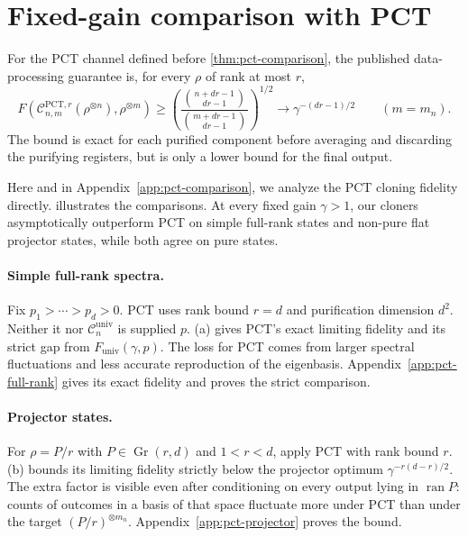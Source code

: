 \documentclass[11pt]{article}
\theoremstyle{remark}
\theoremstyle{plain}
\newcommand{\cC}{\mathcal C}
\newcommand{\Gr}{\operatorname{Gr}}
\newcommand{\ot}{\otimes}
\newcommand{\Funiv}{F_{\mathrm{univ}}}
\begin{document}
\section{Fixed-gain comparison with PCT}\label{sec:pct-comparison}

For the PCT channel defined before \cref{thm:pct-comparison}, the published
data-processing guarantee
\cite{LiTheilHarrowChuang2026,FanizzaGrinkoScharnhorstSpilecki2026,
JeonSohnOh2026} is, for every \(\rho\) of rank at most \(r\),
\begin{equation}\label{eq:pct-data-processing-lower-bound}
  F\!\left(\cC_{n,m}^{\mathrm{PCT},r}(\rho^{\ot n}),
             \rho^{\ot m}\right)
  \ge
  \left(\frac{\binom{n+dr-1}{dr-1}}
              {\binom{m+dr-1}{dr-1}}\right)^{1/2}
  \longrightarrow\gamma^{-(dr-1)/2}
  \qquad(m=m_n).
\end{equation}
The bound is exact for each purified component before averaging and
discarding the purifying registers, but is only a lower bound for the
final output.

Here and in Appendix~\ref{app:pct-comparison}, we analyze
the PCT cloning fidelity directly.  illustrates
the comparisons.  At every fixed gain \(\gamma>1\), our cloners
asymptotically outperform PCT on simple full-rank states and non-pure
flat projector states, while both agree on pure states.

\paragraph{Simple full-rank spectra.}
Fix \(p_1>\cdots>p_d>0\).  PCT uses rank bound \(r=d\) and purification
dimension \(d^2\). Neither it nor \(\cC_n^{\mathrm{univ}}\) is supplied
\(p\).  \textup{(a)} gives PCT's exact limiting
fidelity and its strict gap from \(\Funiv(\gamma,p)\).  The loss for PCT
comes from larger spectral fluctuations and less accurate reproduction
of the eigenbasis.  Appendix~\ref{app:pct-full-rank} gives its exact
fidelity and proves the strict comparison.

\paragraph{Projector states.}
For \(\rho=P/r\) with \(P\in\Gr(r,d)\) and \(1<r<d\), apply PCT
with rank bound \(r\).  \textup{(b)} bounds its
limiting fidelity strictly below the projector optimum
\(\gamma^{-r(d-r)/2}\).  The extra factor is visible even after conditioning
on every output lying in \(\operatorname{ran}P\): counts of outcomes in a basis of
that space fluctuate more under PCT than under the target
\((P/r)^{\ot m_n}\).  Appendix~\ref{app:pct-projector} proves the bound.
\end{document}
